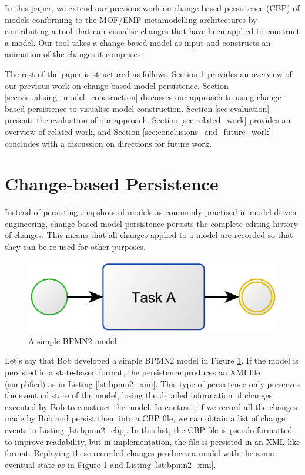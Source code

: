 \documentclass[conference]{IEEEtran}
\begin{document}
In this paper, we extend our previous work on change-based persistence (CBP) of models conforming to the MOF/EMF metamodelling architectures
\cite{DBLP:conf/models/YohannisKP17,yohannis2018towards,DBLP:conf/models/YohannisRPK18,yohannis2018efficient}
by contributing a tool that can visualise changes that have been applied to construct a model. 
Our tool takes a change-based model as input and constructs an animation of the changes it comprises. 

The rest of the paper is structured as follows. 
Section \ref{sec:change-based_persistence} provides an overview of our previous work on change-based model persistence. 
Section \ref{sec:visualising_model_construction} discusses our approach to using change-based persistence to visualise model construction. 
Section \ref{sec:evaluation} presents the evaluation of our approach. 
Section \ref{sec:related_work} provides an overview of related work, and
Section \ref{sec:conclusions_and_future_work} concludes with a discussion on directions for future work.

\section{Change-based Persistence}
\label{sec:change-based_persistence}

Instead of persisting snapshots of models as commonly practised in model-driven engineering, 
change-based model persistence persists the complete editing history of changes. 
This means that all changes applied to a model are recorded so that they can be re-used for other purposes. 

\begin{figure}[h]
    \centering
    \includegraphics[width=0.5\linewidth]{bpmn2}
    \caption{A simple BPMN2 model.}
    \label{fig:bpmn2}
\end{figure}

Let's say that Bob developed a simple BPMN2 model in Figure \ref{fig:bpmn2}. If the model is persisted in a state-based format, 
the persistence produces an XMI file (simplified) as in Listing \ref{lst:bpmn2_xmi}.
This type of persistence only preserves the eventual state of the model,  
losing the detailed information of changes executed by Bob to construct the model. In contrast, 
if we record all the changes made by Bob and persist them into a CBP file, we can obtain a list of change events in Listing \ref{lst:bpmn2_cbp}.
In this list, the CBP file is pseudo-formatted to improve readability, but in implementation, the file is persisted in an XML-like format.
Replaying these recorded changes produces a model with the same eventual state as in Figure \ref{fig:bpmn2} and Listing \ref{lst:bpmn2_xmi}.
\end{document}
